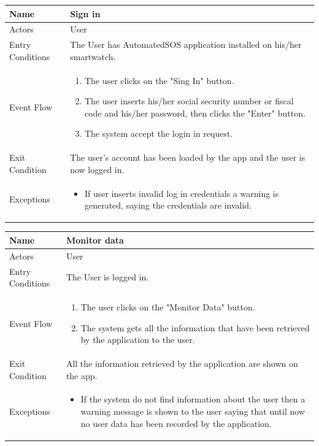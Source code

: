\begin{enumerate}
\FloatBarrier
\begin{table}[h]
\begin{tabular}{|l|p{}|}
\hline
Name             & Sign in \\ \hline
Actors           & User  \\ \hline
Entry Conditions & The User has AutomatedSOS application installed on his/her smartwatch.    \\ \hline
Event Flow       & \begin{enumerate}
            \item The user clicks on the "Sing In" button.
            \item The user inserts his/her social security number or fiscal code and his/her password, then clicks the "Enter" button.
            \item The system accept the login in request.
        \end{enumerate}\\ \hline
Exit Condition   & The user's account has been loaded by the app and the user is now logged in.\\ \hline
Exceptions       & \begin{itemize}
\item If user inserts invalid log in credentials a warning is generated, saying the credentials are invalid.
\end{itemize}\\ \hline
\end{tabular}
\end{table}
\FloatBarrier

\FloatBarrier
\begin{table}[h]
\begin{tabular}{|l|p{}|}
\hline
Name             & Monitor data \\ \hline
Actors           & User  \\ \hline
Entry Conditions & The User is logged in. \\ \hline
Event Flow       & \begin{enumerate}
            \item The user clicks on the "Monitor Data" button.
            \item The system gets all the information that have been retrieved by the application to the user.
\end{enumerate}\\ \hline
Exit Condition   & All the information retrieved by the application are shown on the app.\\ \hline
Exceptions       & \begin{itemize}
\item If the system do not find information about the user then a warning message is shown to the user saying that until now no user data has been recorded by the application.
\end{itemize}  \\ \hline
\end{tabular}
\end{table}
\FloatBarrier


\end{enumerate}
